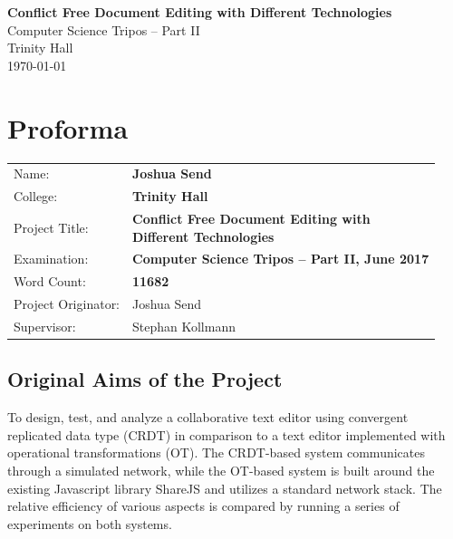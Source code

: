 \documentclass[12pt,a4paper,twoside,openright]{report}
\begin{document}


\thispagestyle{empty}


\vspace*{60mm}
\begin{center}
\Huge
\textbf{Conflict Free Document Editing with Different Technologies} \\[5mm]
Computer Science Tripos -- Part II \\[5mm]
Trinity Hall \\[5mm]
\today  %
\end{center}


\pagestyle{plain}

\chapter*{Proforma}

{\large
\begin{tabular}{ll}
Name:               & \bf Joshua Send                       \\
College:            & \bf Trinity Hall                     \\
Project Title:      & \makecell[tl]{\bf Conflict Free Document Editing with \\ \bf Different Technologies}\\
Examination:        & \bf Computer Science Tripos -- Part II, June 2017  \\
Word Count:         & \bf 11682			\\
Project Originator: & Joshua Send                    \\
Supervisor:         & Stephan Kollmann                    \\ 
\end{tabular}
}


\section*{Original Aims of the Project}

To design, test, and analyze a collaborative text editor using convergent replicated data type (CRDT) in comparison to a text editor implemented with operational transformations (OT). The CRDT-based system communicates through a simulated network, while the OT-based system is built around the existing Javascript library ShareJS and utilizes a standard network stack. The relative efficiency of various aspects is compared by running a series of experiments on both systems.
\end{document}
